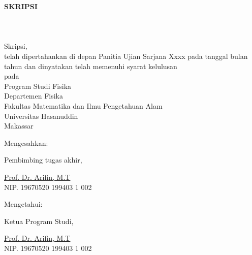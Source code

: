 
\begingroup
\singlespacing
\fontsize{11pt}{13pt}\selectfont
\begin{center}
  \textbf{SKRIPSI} \\
  \vfill
  \textbf{\JudulSkripsi} \\
  \vfill
  \textbf{\underline{\NamaPenulis}} \\
  \textbf{\NIM} \\
  \vfill
  \begingroup
  \fontsize{10pt}{13pt}\selectfont
  Skripsi, \\
  \vfill
  telah dipertahankan di depan Panitia Ujian Sarjana Xxxx pada
  tanggal bulan tahun dan dinyatakan telah memenuhi syarat kelulusan \\
  pada \\
  \vfill
  Program Studi Fisika \\
  Departemen Fisika \\
  Fakultas Matematika dan Ilmu Pengetahuan Alam \\
  Universitas Hasanuddin \\
  Makassar \\
  \vfill
  \noindent
  \begin{minipage}[t]{0.38\textwidth}
    Mengesahkan:\par
    Pembimbing tugas akhir,\par\vspace{2cm}

    \underline{Prof. Dr. Arifin, M.T}\\
    NIP. 19670520 199403 1 002
  \end{minipage}
  \hfill
  \begin{minipage}[t]{0.38\textwidth}
    Mengetahui:\par
    Ketua Program Studi,\par\vspace{2cm}

    \underline{Prof. Dr. Arifin, M.T}\\
    NIP. 19670520 199403 1 002
  \end{minipage}
  \endgroup
\end{center}

\endgroup
\restoregeometry
\clearpage
{}

